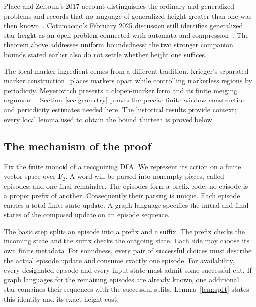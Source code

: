 Place and Zeitoun's 2017 account distinguishes the ordinary and
generalized problems and records that no language of generalized height
greater than one was then known~\cite[\S1]{PlaceZeitoun2017}.
Cotumaccio's February 2025 discussion still identifies generalized star
height as an open problem connected with automata and
compression~\cite[p.~46]{Cotumaccio2025}. The theorem above addresses
uniform boundedness; the two stronger companion bounds stated earlier
also do not settle whether height one suffices.

The local-marker ingredient comes from a different tradition. Krieger's
separated-marker construction~\cite[Lemma~2]{Krieger1982} places markers
apart while controlling markerless regions by periodicity. Meyerovitch
presents a clopen-marker form and its finite merging
argument~\cite[\S3, Lemmas~3.2--3.4]{Meyerovitch2025}. Section~\ref{sec:geometry}
proves the precise finite-window construction and periodicity estimates
needed here. The historical results provide context; every local lemma
used to obtain the bound thirteen is proved below.

\subsection*{The mechanism of the proof}

Fix the finite monoid of a recognizing DFA. We represent its action on a
finite vector space over \(\mathbf F_2\). A word will be parsed into
nonempty pieces, called episodes, and one final remainder. The episodes
form a prefix code: no episode is a proper prefix of another. Consequently
their parsing is unique. Each episode carries a total finite-state update.
A graph language specifies the initial and final states of the composed
update on an episode sequence.

The basic step splits an episode into a prefix and a suffix. The prefix
checks the incoming state and the suffix checks the outgoing state. Each
side may choose its own finite metadata. For soundness, every pair of
successful choices must describe the actual episode update and consume
exactly one episode. For availability, every designated episode and every
input state must admit some successful cut. If graph languages for the
remaining episodes are already known, one additional star combines their
sequences with the successful splits. Lemma~\ref{lem:split} states this
identity and its exact height cost.

